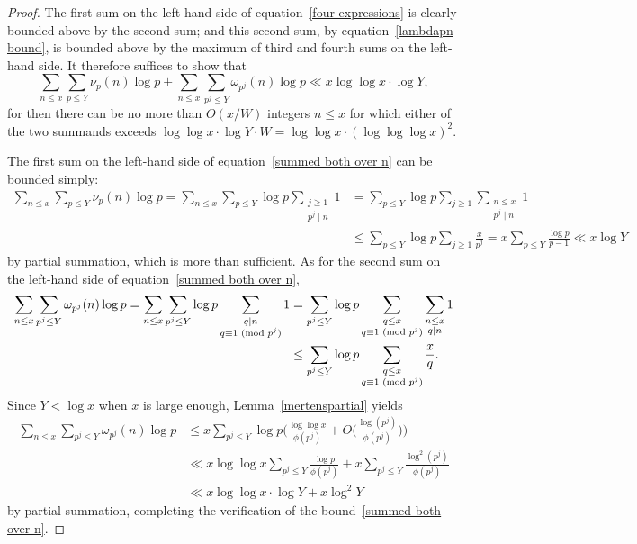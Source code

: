 \documentclass[12pt,reqno]{amsart}
\theoremstyle{definition}
\renewcommand{\mod}[1]{{\ifmmode\text{\rm\ (mod~$#1$)}\else\discretionary{}{}{\hbox{ }}\rm(mod~$#1$)\fi}}
\begin{document}
\begin{proof}
The first sum on the left-hand side of equation~\eqref{four expressions} is clearly bounded above by the second sum; and this second sum, by equation~\eqref{lambdapn bound}, is bounded above by the maximum of third and fourth sums on the left-hand side. It therefore suffices to show that
\begin{equation} \label{summed both over n}
\sum_{n\le x} \sum_{p\le Y} \nu_p(n)\log p + \sum_{n\le x} \sum_{p^j\le Y} \omega_{p^j}(n)\log p \ll x\log\log x \cdot \log Y,
\end{equation}
for then there can be no more than $O(x/W)$ integers $n\le x$ for which either of the two summands exceeds $\log\log x\cdot\log Y\cdot W = \log\log x \cdot (\log\log\log x)^2$.

The first sum on the left-hand side of equation~\eqref{summed both over n} can be bounded simply:
\begin{align*}
\sum_{n\le x} \sum_{p\le Y} \nu_p(n)\log p = \sum_{n\le x} \sum_{p\le Y} \log p \sum_{\substack{j\ge1 \\ p^j\mid n}} 1 &= \sum_{p\le Y} \log p \sum_{j\ge1} \sum_{\substack{n\le x \\ p^j\mid n}} 1 \\
&\le \sum_{p\le Y} \log p \sum_{j\ge1} \frac x{p^j} = x \sum_{p\le Y} \frac{\log p}{p-1} \ll x\log Y
\end{align*}
by partial summation, which is more than sufficient. As for the second sum on the left-hand side of equation~\eqref{summed both over n},
\begin{align*}
\sum_{n\le x} \sum_{p^j\le Y} \omega_{p^j}(n)\log p = \sum_{n\le x} \sum_{p^j\le Y} \log p \sum_{\substack{q\mid n \\ q\equiv1\mod{p^j}}} 1 &= \sum_{p^j\le Y} \log p \sum_{\substack{q\le x \\ q\equiv1\mod{p^j}}} \sum_{\substack{n\le x \\ q\mid n}} 1 \\
&\le \sum_{p^j\le Y} \log p \sum_{\substack{q\le x \\ q\equiv1\mod{p^j}}} \frac xq.
\end{align*}
Since $Y < \log x$ when $x$ is large enough, Lemma~\ref{mertenspartial} yields
\begin{align*}
\sum_{n\le x} \sum_{p^j\le Y} \omega_{p^j}(n)\log p &\le x \sum_{p^j\le Y} \log p \bigg( \frac{\log\log x}{\phi(p^j)} + O\bigg( \frac{\log(p^j)}{\phi(p^j)} \bigg) \bigg) \\
&\ll x\log\log x \sum_{p^j\le Y} \frac{\log p}{\phi(p^j)} + x \sum_{p^j\le Y} \frac{\log^2(p^j)}{\phi(p^j)} \\
&\ll x\log\log x \cdot \log Y + x\log^2 Y
\end{align*}
by partial summation, completing the verification of the bound~\eqref{summed both over n}.
\end{proof}
\end{document}
